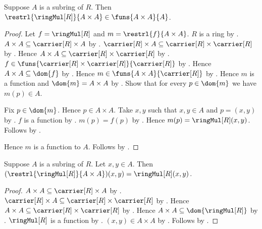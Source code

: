 \begin{proposition}\label{subring_mul_restriction_type}
    Suppose $A$ is a subring of $R$.
    Then $\restrl{\ringMul[R]}{A\times A}\in\funs{A\times A}{A}$.
\end{proposition}
\begin{proof}
    Let $f=\ringMul[R]$ and $m=\restrl{f}{A\times A}$.
    $R$ is a ring by .
    $A\times A\subseteq\carrier[R]\times A$ by
        .
    $\carrier[R]\times A
        \subseteq\carrier[R]\times\carrier[R]$ by
        .
    Hence $A\times A\subseteq\carrier[R]\times\carrier[R]$ by
        .
    $f\in\funs{\carrier[R]\times\carrier[R]}{\carrier[R]}$ by
        .
    Hence $A\times A\subseteq\dom{f}$ by .
    Hence $m\in\funs{A\times A}{\carrier[R]}$ by
        .
    Hence $m$ is a function and $\dom{m}=A\times A$ by
        .
    Show that for every $p\in\dom{m}$ we have $m(p)\in A$.
    \begin{subproof}
        Fix $p\in\dom{m}$.
        Hence $p\in A\times A$.
        Take $x,y$ such that $x,y\in A$ and $p=(x,y)$ by
            .
        $f$ is a function by .
        $m(p)=f(p)$ by .
        Hence $m(p)=\ringMul[R](x,y)$.
        Follows by .
    \end{subproof}
    Hence $m$ is a function to $A$.
    Follows by .
\end{proof}

\begin{proposition}\label{subring_mul_restriction_apply}
    Suppose $A$ is a subring of $R$.
    Let $x,y\in A$.
    Then $(\restrl{\ringMul[R]}{A\times A})(x,y)
        =\ringMul[R](x,y)$.
\end{proposition}
\begin{proof}
    $A\times A\subseteq\carrier[R]\times A$ by
        .
    $\carrier[R]\times A
        \subseteq\carrier[R]\times\carrier[R]$ by
        .
    Hence $A\times A\subseteq\carrier[R]\times\carrier[R]$ by
        .
    Hence $A\times A\subseteq\dom{\ringMul[R]}$ by
        .
    $\ringMul[R]$ is a function by
        .
    $(x,y)\in A\times A$ by .
    Follows by .
\end{proof}

